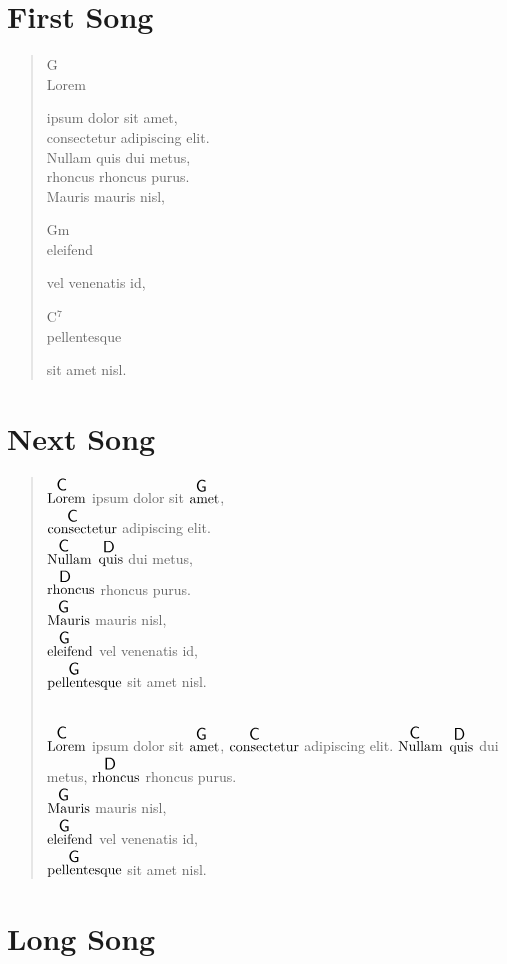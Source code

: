 \documentclass[twocolumn]{article}
\newcommand{\ch}[2]{$\overset{ \resizebox*{!}{1.2\height}{\textsf{#2}} }{\text{#1}}$}
\newlength{\nxword}
\newcommand{\chh}[2]{\settowidth{\nxword}{#1}\parbox[b]{\nxword}{\textsf{\large #2}\\ #1}}
\begin{document}
\section*{First Song}

\begin{verse}

\chh{Lorem}{G} ipsum dolor sit amet, \\
consectetur adipiscing elit.\\
Nullam quis dui metus, \\
rhoncus rhoncus purus. \\
Mauris mauris nisl, \\
\chh{eleifend}{Gm} vel venenatis id, \\
\chh{pellentesque}{C$^7$} sit amet nisl.

\end{verse}

\section*{Next Song}

\begin{verse}

\ch{Lorem}{C} ipsum dolor sit \ch{amet}{G}, \\
\ch{consectetur}{C} adipiscing elit.\\
\ch{Nullam}{C} \ch{quis}{D} dui metus, \\
\ch{rhoncus}{D} rhoncus purus. \\
\ch{Mauris}{G} mauris nisl, \\
\ch{eleifend}{G} vel venenatis id, \\
\ch{pellentesque}{G} sit amet nisl.

~\\

\ch{Lorem}{C} ipsum dolor sit \ch{amet}{G}, 
\ch{consectetur}{C} adipiscing elit.
\ch{Nullam}{C} \ch{quis}{D} dui metus, 
\ch{rhoncus}{D} rhoncus purus. \\
\ch{Mauris}{G} mauris nisl, \\
\ch{eleifend}{G} vel venenatis id, \\
\ch{pellentesque}{G} sit amet nisl.

\end{verse}

\section*{Long Song}
\end{document}
